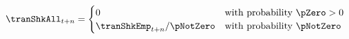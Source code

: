   \begin{equation}
    \tranShkAll _{t+n}=
    \begin{cases}
      0\phantom{_{t+1}/\pNotZero} & \text{with probability $\pZero>0$} \\
      \tranShkEmp_{t+n}/\pNotZero      & \text{with probability $\pNotZero  $} %
    \end{cases} \label{eq:TranShkDef}
  \end{equation}
